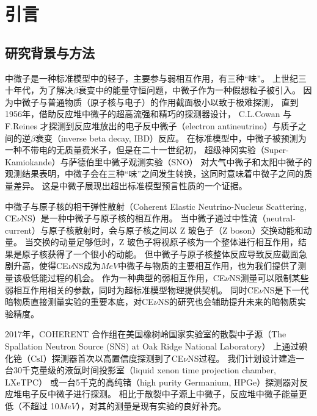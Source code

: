 
\chapter{引言}

\section{研究背景与方法}

中微子是一种标准模型中的轻子，主要参与弱相互作用，有三种``味''。
上世纪三十年代，为了解决$\beta$衰变中的能量守恒问题，中微子作为一种假想粒子被引入。
因为中微子与普通物质（原子核与电子）的作用截面极小以致于极难探测，
直到1956年，借助反应堆中微子的超高流强和精巧的探测器设计，
C.L.Cowan 与 F.Reines 才探测到反应堆放出的电子反中微子（electron antineutrino）与质子之间的逆$\beta$衰变（inverse beta decay, IBD）反应\cite{cowan_detection_1956}。
在标准模型中，中微子被预测为一种不带电的无质量费米子，但是在二十一世纪初，
超级神冈实验（Super-Kamiokande）\cite{collaboration_evidence_1998}与萨德伯里中微子观测实验（SNO）\cite{sno_collaboration_direct_2002}
对大气中微子和太阳中微子的观测结果表明，中微子会在三种``味''之间发生转换，这同时意味着中微子之间的质量差异。
这是中微子展现出超出标准模型预言性质的一个证据。

中微子与原子核的相干弹性散射（Coherent Elastic Neutrino-Nucleus Scattering, CE$\nu$NS）是一种中微子与原子核的相互作用。
当中微子通过中性流（neutral-current）与原子核散射时，会与原子核之间以 Z 玻色子（Z boson）交换动能和动量。
当交换的动量足够低时，Z 玻色子将视原子核为一个整体进行相互作用，结果是原子核获得了一个很小的动能。
但中微子与原子核整体反应导致反应截面急剧升高，使得CE$\nu$NS成为$\si{MeV}$中微子与物质的主要相互作用，也为我们提供了测量该极低能过程的机会。
作为一种典型的弱相互作用，CE$\nu$NS测量可以限制某些弱相互作用相关的参数，同时为超标准模型物理提供契机。
同时CE$\nu$NS是下一代暗物质直接测量实验的重要本底\cite{ohare_fog_2021}，对CE$\nu$NS的研究也会辅助提升未来的暗物质实验精度。

2017年，COHERENT 合作组在美国橡树岭国家实验室的散裂中子源（The Spallation Neutron Source (SNS) at Oak Ridge National Laboratory）
上通过碘化铯（$\mathrm{CsI}$）探测器首次以高置信度探测到了CE$\nu$NS过程。
我们计划设计建造一台30千克量级的液氙时间投影室（liquid xenon time projection chamber, LXeTPC）
或一台5千克的高纯锗（high purity Germanium, HPGe）探测器对反应堆电子反中微子进行探测。
相比于散裂中子源上中微子，反应堆中微子能量更低（不超过 10$\si{MeV}$），对其的测量是现有实验的良好补充。

